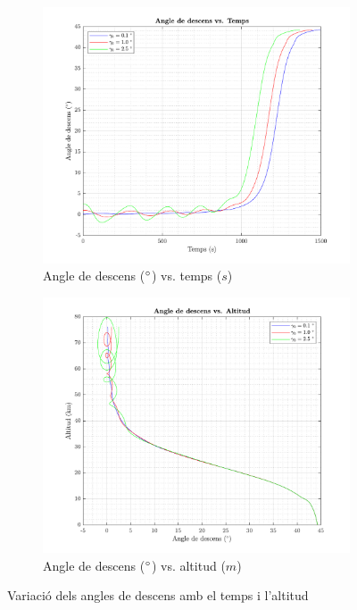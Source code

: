 \begin{figure}[ht]
    \centering
    \begin{subfigure}{.5\textwidth}
        \centering
        \includegraphics[width=\linewidth]{imagenes/02_lifting_graficas/angle_descens_vs_temps.pdf}
        \caption{Angle de descens ($\mathrm{^{\circ}}$) vs. temps ($s$)}
        \label{fig:angle_descens_vs_temps_aaaaaaaaaaaa}
    \end{subfigure}%
    \begin{subfigure}{.5\textwidth}
        \centering
        \includegraphics[width=\linewidth]{imagenes/02_lifting_graficas/angle_descens_vs_altitud.pdf}
        \caption{Angle de descens ($\mathrm{^{\circ}}$) vs. altitud ($m$)}
        \label{fig:angle_descens_vs_altitud_aaaaaaaaaaa}
    \end{subfigure}
    \caption{Variació dels angles de descens amb el temps i l'altitud}
    \label{fig:angle_lift}
\end{figure}


